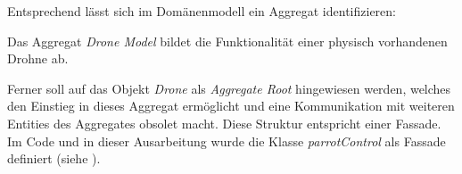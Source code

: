 Entsprechend  lässt sich im Domänenmodell ein Aggregat identifizieren:

Das Aggregat \textit{Drone Model} bildet die Funktionalität einer physisch vorhandenen Drohne ab.

Ferner soll auf das Objekt \textit{Drone} als \textit{Aggregate Root} hingewiesen werden, welches den Einstieg in dieses Aggregat ermöglicht und eine Kommunikation mit weiteren Entities des Aggregates obsolet macht. Diese Struktur entspricht einer Fassade. Im Code und in dieser Ausarbeitung wurde die Klasse \textit{parrotControl} als Fassade definiert (siehe ).







